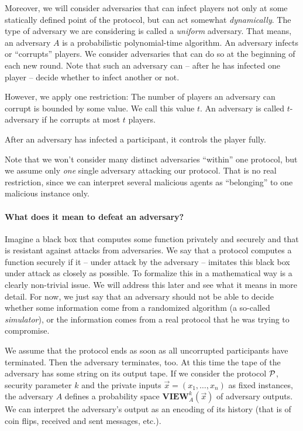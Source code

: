 Moreover, we will consider adversaries that can infect players not only at some statically defined point of the protocol, but can act somewhat \emph{dynamically}. The type of adversary we are considering is called a \emph{uniform} adversary. That means, an adversary $A$ is a probabilistic polynomial-time algorithm. An adversary infects or ``corrupts'' players. We consider adversaries that can do so at the beginning of each new round. Note that such an adversary can -- after he has infected one player -- decide whether to infect another or not.

However, we apply one restriction: The number of players an adversary can corrupt is bounded by some value. We call this value $t$. An adversary is called $t$-adversary if he corrupts at most $t$ players.

After an adversary has infected a participant, it controls the player fully.

Note that we won't consider many distinct adversaries ``within'' one protocol, but we assume only \emph{one} single adversary attacking our protocol. That is no real restriction, since we can interpret several malicious agents as ``belonging'' to one malicious instance only.

\paragraph{What does it mean to defeat an adversary?}

Imagine a black box that computes some function privately and securely and that is resistant against attacks from adversaries. We say that a protocol computes a function securely if it -- under attack by the adversary -- imitates this black box under attack as closely as possible. To formalize this in a mathematical way is a clearly non-trivial issue. We will address this later and see what it means in more detail. For now, we just say that an adversary should not be able to decide whether some information come from a randomized algorithm (a so-called \emph{simulator}), or the information comes from a real protocol that he was trying to compromise.

We assume that the protocol ends as soon as all uncorrupted participants have terminated. Then the adversary terminates, too. At this time the tape of the adversary has some string on its output tape. If we consider the protocol ${\cal P}$, security parameter $k$ and the private inputs $\overrightarrow{x}=(x_1,\dots,x_n)$ as fixed instances, the adversary $A$ defines a probability space $\mathbf{VIEW}_A^k(\overrightarrow{x})$ of adversary outputs. We can interpret the adversary's output as an encoding of its history (that is of coin flips, received and sent messages, etc.).

